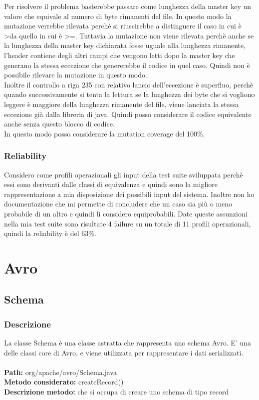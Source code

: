 \documentclass[12pt, a4paper]{article}
\begin{document}
Per risolvere il problema basterebbe passare come lunghezza della master key un valore che equivale al numero di byte rimanenti
del file. In questo modo la mutazione verrebbe rilevata perchè si riuscirebbe a distinguere il caso in cui è \textgreater da quello in cui
è \textgreater=. Tuttavia la mutazione non viene rilevata perchè anche se la lunghezza della master key dichiarata fosse uguale alla
lunghezza rimanente, l'header contiene degli altri campi che vengono letti dopo la master key che generano la stessa eccezione 
che genererebbe il codice in quel caso. Quindi non è possibile rilevare la mutazione in questo modo. \\
Inoltre il controllo a riga 235 con relativo lancio dell'eccezione è superfluo, perchè quando successivamente si tenta la lettura
se la lunghezza dei byte che si vogliono leggere è maggiore della lunghezza rimanente del file, viene lanciata la stessa eccezione
già dalla libreria di java. Quindi posso considerare il codice equivalente anche senza questo blocco di codice. \\
In questo modo posso considerare la mutation coverage del 100\%.

\subsubsection{Reliability}
Considero come profili operazionali gli input della test suite sviluppata perchè essi sono derivanti dalle classi di equivalenza
e quindi sono la migliore rappresentazione a mia disposizione dei possibili input del sistema. Inoltre non ho documentazione che
mi permette di concludere che un caso sia più o meno probabile di un altro e quindi li considero equiprobabili. Date queste 
assunzioni nella mia test suite sono risultate 4 failure su un totale di 11 profili operazionali, quindi la reliability è del 63\%.

\newpage
\section{Avro}
\subsection{Schema}
\subsubsection{Descrizione}
La classe Schema è una classe astratta che rappresenta uno schema Avro. E' una delle classi core di Avro, e viene utilizzata
per rappresentare i dati serializzati. \\ \\
\textbf{Path:} org/apache/avro/Schema.java \\
\textbf{Metodo considerato:} createRecord() \\
\textbf{Descrizione metodo:} che si occupa di creare uno schema di tipo record 
\end{document}

